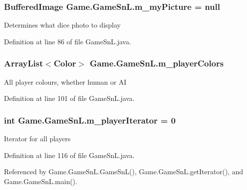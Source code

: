 \subsubsection[{m\+\_\+my\+Picture}]{\setlength{\rightskip}{0pt plus 5cm}Buffered\+Image Game.\+Game\+Sn\+L.\+m\+\_\+my\+Picture = null\hspace{0.3cm}{\ttfamily [private]}}\label{class_game_1_1_game_sn_l_af12170048b789d0c3303ab35c9b58413}
Determines what dice photo to display 

Definition at line 86 of file Game\+Sn\+L.\+java.

\hypertarget{class_game_1_1_game_sn_l_aab5fbfe1044b0a403fdfa7634c0c344b}{}
\subsubsection[{m\+\_\+player\+Colors}]{\setlength{\rightskip}{0pt plus 5cm}Array\+List$<$Color$>$ Game.\+Game\+Sn\+L.\+m\+\_\+player\+Colors\hspace{0.3cm}{\ttfamily [private]}}\label{class_game_1_1_game_sn_l_aab5fbfe1044b0a403fdfa7634c0c344b}
All player colours, whether human or A\+I 

Definition at line 101 of file Game\+Sn\+L.\+java.

\hypertarget{class_game_1_1_game_sn_l_a4cff3283ef1f344a871b2019ae92dd57}{}
\subsubsection[{m\+\_\+player\+Iterator}]{\setlength{\rightskip}{0pt plus 5cm}int Game.\+Game\+Sn\+L.\+m\+\_\+player\+Iterator = 0\hspace{0.3cm}{\ttfamily [private]}}\label{class_game_1_1_game_sn_l_a4cff3283ef1f344a871b2019ae92dd57}
Iterator for all players 

Definition at line 116 of file Game\+Sn\+L.\+java.



Referenced by Game.\+Game\+Sn\+L.\+Game\+Sn\+L(), Game.\+Game\+Sn\+L.\+get\+Iterator(), and Game.\+Game\+Sn\+L.\+main().

\hypertarget{class_game_1_1_game_sn_l_a0faf146bfc9f0bd5814b3b3c71c00a20}{}
